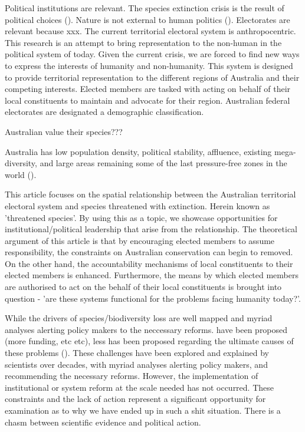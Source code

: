 \documentclass[a4paper,11pt]{article}
\begin{document}
Political institutions are relevant. The species extinction crisis is the result of political choices (\cite{Dalby2017[TODO]}). Nature is not external to human politics (\cite{burkeSpeciesBordersPolitical2020}). Electorates are relevant because xxx. The current territorial electoral system is anthropocentric. 
This research is an attempt to bring representation to the non-human in the political system of today. Given the current crisis, we are forced to find new ways to express the interests of humanity and non-humanity.
This system is designed to provide territorial representation to the different regions of Australia and their competing interests. Elected members are tasked with acting on behalf of their local constituents to maintain and advocate for their region. Australian federal electorates are designated a demographic classification.

Australian value their species???

Australia has low population density, political stability, affluence, existing mega-diversity, and large areas remaining some of the last pressure-free zones in the world (\cite{venterSixteenYearsChange2016}). 


This article focuses on the spatial relationship between the Australian territorial electoral system and species threatened with extinction. Herein known as 'threatened species'. By using this as a topic, we showcase opportunities for institutional/political leadership that arise from the relationship. The theoretical argument of this article is that by encouraging elected members to assume responsibility, the constraints on Australian conservation can begin to removed. On the other hand, the accountability mechanisms of local constituents to their elected members is enhanced. Furthermore, the means by which elected members are authorised to act on the behalf of their local constituents is brought into question - 'are these systems functional for the problems facing humanity today?'.

While the drivers of species/biodiversity loss are well mapped and myriad analyses alerting policy makers to the neccessary reforms. have been proposed (more funding, etc etc), less has been proposed regarding the ultimate causes of these problems (\cite{rydenLinkingDemocracyBiodiversity2020}).
These challenges have been explored and explained by scientists over decades, with myriad analyses alerting policy makers, and recommending the necessary reforms. However, the implementation of institutional or system reform at the scale needed has not occurred. These constraints and the lack of action represent a significant opportunity for examination as to why we have ended up in such a shit situation. There is a chasm between scientific evidence and political action.
\end{document}

